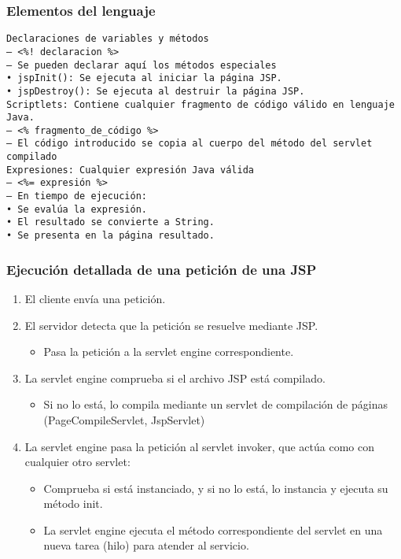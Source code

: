 \documentclass{apuntes}
\begin{document}
\subsubsection{Elementos del lenguaje}
\begin{verbatim}
Declaraciones de variables y métodos
– <%! declaracion %>
– Se pueden declarar aquí los métodos especiales
• jspInit(): Se ejecuta al iniciar la página JSP.
• jspDestroy(): Se ejecuta al destruir la página JSP.
Scriptlets: Contiene cualquier fragmento de código válido en lenguaje Java.
– <% fragmento_de_código %>
– El código introducido se copia al cuerpo del método del servlet compilado
Expresiones: Cualquier expresión Java válida
– <%= expresión %>
– En tiempo de ejecución:
• Se evalúa la expresión.
• El resultado se convierte a String.
• Se presenta en la página resultado.
\end{verbatim}

\subsubsection{Ejecución detallada de una petición de una JSP}
\begin{enumerate}
\item El cliente envía una petición.
\item El servidor detecta que la petición se resuelve mediante JSP.
\begin{itemize}
\item Pasa la petición a la servlet engine correspondiente.
\end{itemize}
\item La servlet engine comprueba si el archivo JSP está compilado.
\begin{itemize}
\item Si no lo está, lo compila mediante un servlet de compilación de páginas (PageCompileServlet, JspServlet)
\end{itemize}
\item La servlet engine pasa la petición al servlet invoker, que actúa como con cualquier otro servlet:
\begin{itemize}
\item Comprueba si está instanciado, y si no lo está, lo instancia y ejecuta su método init.
\item La servlet engine ejecuta el método correspondiente del servlet en una nueva tarea (hilo) para atender al servicio.
\end{itemize}

\end{enumerate}
\normalsize
\printindex
\end{document}
